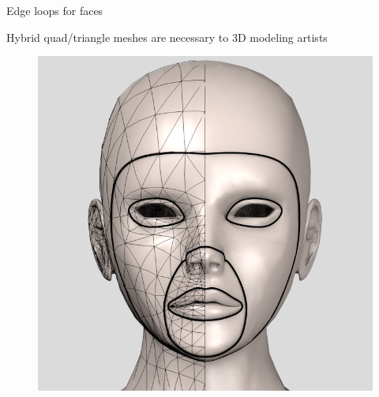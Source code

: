 \documentclass[10pt, compress, english]{beamer}
\begin{document}
\begin{frame}{Edge loops for faces}


Hybrid quad/triangle meshes are necessary to 3D modeling artists


\begin{center}
\begin{minipage}[c]{0.48\columnwidth}%
\begin{figure}
\begin{centering}
\includegraphics[width=1\columnwidth]{img/quad_faces2}
\par\end{centering}


\end{figure}
\end{minipage}
\end{center}
\end{frame}
\end{document}
